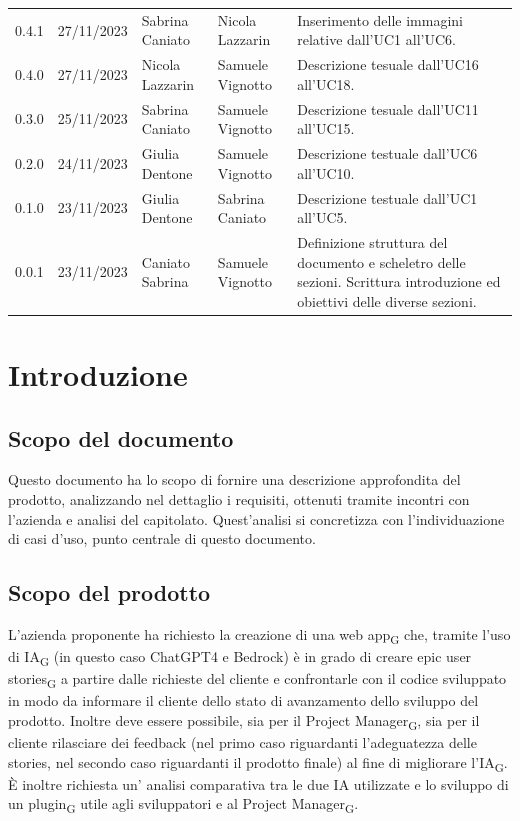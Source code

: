 \documentclass{article}
\begin{document}
\begin{center}
\begin{tabular}{P{4em} P{6em} P{7em} P{7em} P{11em}} 
    0.4.1 & 27/11/2023 & Sabrina Caniato & Nicola Lazzarin & Inserimento delle immagini relative dall'UC1 all'UC6.\\
    0.4.0 & 27/11/2023 & Nicola Lazzarin & Samuele Vignotto & Descrizione tesuale dall'UC16 all'UC18. \\
    0.3.0 & 25/11/2023 & Sabrina Caniato & Samuele Vignotto & Descrizione tesuale dall'UC11 all'UC15. \\
    0.2.0 & 24/11/2023 & Giulia Dentone & Samuele Vignotto & Descrizione testuale dall'UC6 all'UC10.\\ 
    0.1.0 & 23/11/2023 & Giulia Dentone & Sabrina Caniato & Descrizione testuale dall'UC1 all'UC5.\\
    0.0.1 & 23/11/2023 & Caniato Sabrina  & Samuele Vignotto & Definizione struttura del documento e scheletro delle sezioni. Scrittura introduzione ed obiettivi delle diverse sezioni.\\ 
\end{tabular}
\end{center}
\newpage
\tableofcontents
\listoffigures
\listoftables
\newpage
\section*{Introduzione}

\subsection*{Scopo del documento}

Questo documento ha lo scopo di fornire una descrizione approfondita del prodotto, analizzando nel dettaglio i requisiti, ottenuti tramite incontri con l'azienda e analisi del capitolato. Quest'analisi si concretizza con l'individuazione di casi d'uso, punto centrale di questo documento.


\subsection*{Scopo del prodotto}
L'azienda proponente ha richiesto la creazione di una web app\textsubscript{G} che, tramite l'uso di IA\textsubscript{G} (in questo caso ChatGPT4 e Bedrock) è in grado di creare epic user stories\textsubscript{G} a partire dalle richieste del cliente e confrontarle con il codice sviluppato in modo da informare il cliente dello stato di avanzamento dello sviluppo del prodotto. Inoltre deve essere possibile, sia per il Project Manager\textsubscript{G}, sia per il cliente rilasciare dei feedback (nel primo caso riguardanti l'adeguatezza delle stories, nel secondo caso riguardanti il prodotto finale) al fine di migliorare l'IA\textsubscript{G}. È inoltre richiesta un' analisi comparativa tra le due IA utilizzate e lo sviluppo di un plugin\textsubscript{G} utile agli sviluppatori e al Project Manager\textsubscript{G}.
\end{document}
